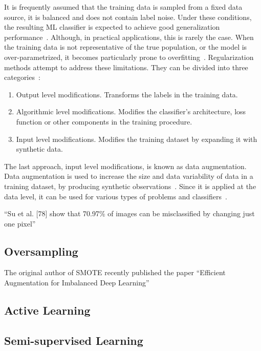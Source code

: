 \documentclass[parskip=full]{scrartcl}
\begin{document}
It is frequently assumed that the training data is sampled from a fixed data
source, it is balanced and does not contain label noise. Under these
conditions, the resulting ML classifier is expected to achieve good
generalization performance~\cite{benning2018modern}. Although, in practical
applications, this is rarely the case. When the training data is not
representative of the true population, or the model is over-parametrized, it
becomes particularly prone to overfitting~\cite{Bartlett2021}. Regularization
methods attempt to address these limitations. They can be divided into three
categories~\cite{santos2022avoiding}:

\begin{enumerate}
    \item Output level modifications. Transforms the labels in the training
        data.
    \item Algorithmic level modifications. Modifies the classifier's
        architecture, loss function or other components in the training
        procedure.
    \item Input level modifications. Modifies the training dataset by expanding it
        with synthetic data.
\end{enumerate}

The last approach, input level modifications, is known as data augmentation.
Data augmentation is used to increase the size and data variability of data in
a training dataset, by producing synthetic observations~\cite{Van2001,
Wong2016}. Since it is applied at the data level, it can be used for various
types of problems and classifiers~\cite{Behpour2019}. 


``Su et al. [78] show that 70.97\% of images can be misclassified by changing
just one pixel'' \citet{shorten2019survey}

\subsection{Oversampling}

The original author of SMOTE recently published the paper ``Efficient Augmentation for Imbalanced Deep
Learning''~\cite{dablain2022efficient}

\subsection{Active Learning}

\subsection{Semi-supervised Learning}
\end{document}
